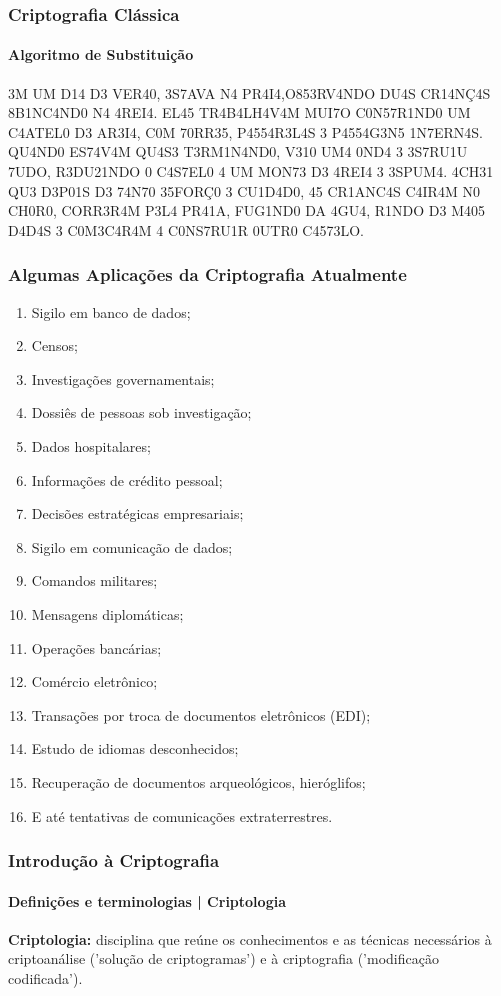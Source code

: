 \documentclass[compress]{beamer}
\begin{document}
\begin{frame}
\frametitle{Criptografia Clássica}
\framesubtitle{Algoritmo de Substituição}
\justifying
3M UM D14 D3 VER40, 3S7AVA N4 PR4I4,O853RV4NDO DU4S CR14NÇ4S 8B1NC4ND0 N4 4REI4. EL45 TR4B4LH4V4M MUI7O C0N57R1ND0 UM C4ATEL0 D3 AR3I4, C0M 70RR35, P4554R3L4S 3 P4554G3N5 1N7ERN4S. QU4ND0 ES74V4M QU4S3 T3RM1N4ND0, V310 UM4 0ND4 3 3S7RU1U 7UDO, R3DU21NDO 0 C4S7EL0 4 UM MON73 D3 4REI4 3 3SPUM4. 4CH31 QU3 D3P01S D3 74N70 35FORÇ0 3 CU1D4D0, 45 CR1ANC4S C4IR4M N0 CH0R0,
CORR3R4M P3L4 PR41A, FUG1ND0 DA 4GU4, R1NDO D3 M405 D4D4S 3 C0M3C4R4M 4 C0NS7RU1R 0UTR0 C4573LO. 
\end{frame}


\begin{frame}
\frametitle{Algumas Aplicações da Criptografia Atualmente}
		\begin{enumerate}
			\item{Sigilo em banco de dados;}
			\item{Censos;}
			\item{Investigações governamentais;}
			\item{Dossiês de pessoas sob investigação;}
			\item{Dados hospitalares;}
			\item{Informações de crédito pessoal;}
			\item{Decisões estratégicas empresariais;}
			\item{Sigilo em comunicação de dados;}
			\item{Comandos militares;}
			\item{Mensagens diplomáticas;}
			\item{Operações bancárias;}
			\item{Comércio eletrônico;}
			\item{Transações por troca de documentos eletrônicos (EDI);}
			\item{Estudo de idiomas desconhecidos;}
			\item{Recuperação de documentos arqueológicos, hieróglifos;}
			\item{E até tentativas de comunicações extraterrestres.}
		\end{enumerate}
\end{frame}

\begin{frame}
\frametitle{Introdução à Criptografia}
\framesubtitle{Definições e terminologias | Criptologia}
\justifying
	\textbf{Criptologia:} disciplina que reúne os conhecimentos e as técnicas necessários à criptoanálise ('solução de criptogramas') e à criptografia ('modificação codificada').
\end{frame}
\end{document}
